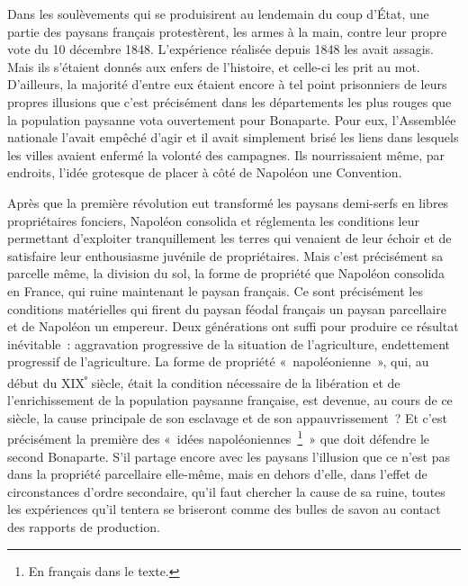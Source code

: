\documentclass[french,twoside]{book} %
\begin{document}
Dans les soulèvements qui se produisirent au lendemain du coup d’État, une partie des paysans français protestèrent, les armes à la main, contre leur propre vote du 10 décembre 1848. L’expérience réalisée depuis 1848 les avait assagis. Mais ils s’étaient donnés aux enfers de l’histoire, et celle-ci les prit au mot. D’ailleurs, la majorité d’entre eux étaient encore à tel point prisonniers de leurs propres illusions que c’est précisément dans les départements les plus rouges que la population paysanne vota ouvertement pour Bonaparte. Pour eux, l’Assemblée nationale l’avait empêché d’agir et il avait simplement brisé les liens dans lesquels les villes avaient enfermé la volonté des campagnes. Ils nourrissaient même, par endroits, l’idée grotesque de placer à côté de Napoléon une Convention.\par
Après que la première révolution eut transformé les paysans demi-serfs en libres propriétaires fonciers, Napoléon consolida et réglementa les conditions leur permettant d’exploiter tranquillement les terres qui venaient de leur échoir et de satisfaire leur enthousiasme juvénile de propriétaires. Mais c’est précisément sa parcelle même, la division du sol, la forme de propriété que Napoléon consolida en France, qui ruine maintenant le paysan français. Ce sont précisément les conditions matérielles qui firent du paysan féodal français un paysan parcellaire et de Napoléon un empereur. Deux générations ont suffi pour produire ce résultat inévitable : aggravation progressive de la situation de l’agriculture, endettement progressif de l’agriculture. La forme de propriété « napoléonienne », qui, au début du XIX\textsuperscript{ᵉ} siècle, était la condition nécessaire de la libération et de l’enrichissement de la population paysanne française, est devenue, au cours de ce siècle, la cause principale de son esclavage et de son appauvrissement ? Et c’est précisément la première des « idées napoléoniennes \footnote{En français dans le texte.} » que doit défendre le second Bonaparte. S’il partage encore avec les paysans l’illusion que ce n’est pas dans la propriété parcellaire elle-même, mais en dehors d’elle, dans l’effet de circonstances d’ordre secondaire, qu’il faut chercher la cause de sa ruine, toutes les expériences qu’il tentera se briseront comme des bulles de savon au contact des rapports de production.\par
\end{document}
